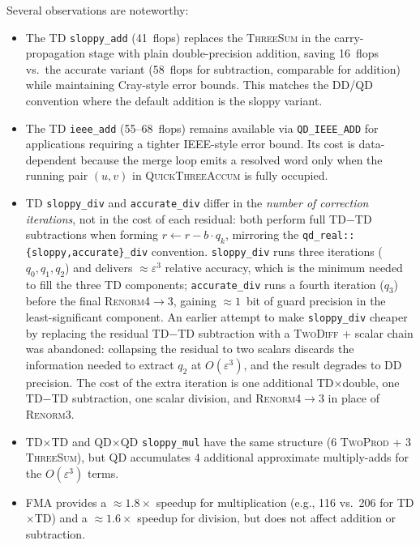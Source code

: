 \documentclass[11pt,a4paper]{article}
\begin{document}
Several observations are noteworthy:

\begin{itemize}
\item The TD \texttt{sloppy\_add} (41~flops) replaces the
  \textsc{ThreeSum} in the carry-propagation stage with plain
  double-precision addition, saving 16~flops vs.\ the accurate
  variant (58~flops for subtraction, comparable for addition) while
  maintaining Cray-style error bounds.  This matches the DD/QD
  convention where the default addition is the sloppy variant.

\item The TD \texttt{ieee\_add} (55--68~flops) remains available via
  \texttt{QD\_IEEE\_ADD} for applications requiring a tighter IEEE-style
  error bound.  Its cost is data-dependent because the merge loop
  emits a resolved word only when the running pair $(u, v)$ in
  \textsc{QuickThreeAccum} is fully occupied.

\item TD \texttt{sloppy\_div} and \texttt{accurate\_div} differ in the
  \emph{number of correction iterations}, not in the cost of each
  residual: both perform full TD$-$TD subtractions when forming
  $r \gets r - b\cdot q_k$, mirroring the
  \texttt{qd\_real::\{sloppy,accurate\}\_div} convention.
  \texttt{sloppy\_div} runs three iterations ($q_0,q_1,q_2$) and
  delivers $\approx \varepsilon^3$ relative accuracy, which is the
  minimum needed to fill the three TD components;
  \texttt{accurate\_div} runs a fourth iteration ($q_3$) before the
  final \textsc{Renorm4}$\to$3, gaining $\approx 1$~bit of guard
  precision in the least-significant component.  An earlier attempt
  to make \texttt{sloppy\_div} cheaper by replacing the residual
  TD$-$TD subtraction with a \textsc{TwoDiff} + scalar chain was
  abandoned: collapsing the residual to two scalars discards the
  information needed to extract $q_2$ at $O(\varepsilon^3)$, and the
  result degrades to DD precision.  The cost of the extra iteration
  is one additional TD$\times$double, one TD$-$TD subtraction, one
  scalar division, and \textsc{Renorm4}$\to$3 in place of
  \textsc{Renorm3}.

\item TD$\times$TD and QD$\times$QD \texttt{sloppy\_mul} have the
  same structure (6 \textsc{TwoProd} + 3 \textsc{ThreeSum}), but
  QD accumulates 4 additional approximate multiply-adds for the
  $O(\varepsilon^3)$ terms.

\item FMA provides a $\approx 1.8\times$ speedup for multiplication
  (e.g., 116 vs.\ 206 for TD$\times$TD) and a $\approx 1.6\times$
  speedup for division, but does not affect addition or subtraction.
\end{itemize}
\end{document}
